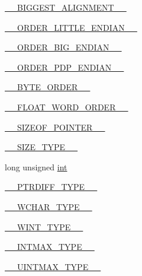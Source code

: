 \begin{DoxyCompactItemize}
\item 
\hyperlink{cmake-build-release_2CMakeCache_8txt_ade3bae6ac3c6cb0079bc5a1a61316c5a}{\+\_\+\+\_\+\+B\+I\+G\+G\+E\+S\+T\+\_\+\+A\+L\+I\+G\+N\+M\+E\+N\+T\+\_\+\+\_\+}
\item 
\hyperlink{cmake-build-release_2CMakeCache_8txt_a668b60d2f5086a7b075f8d739e3a02d5}{\+\_\+\+\_\+\+O\+R\+D\+E\+R\+\_\+\+L\+I\+T\+T\+L\+E\+\_\+\+E\+N\+D\+I\+A\+N\+\_\+\+\_\+}
\item 
\hyperlink{cmake-build-release_2CMakeCache_8txt_aadebb1c0721f9b0a30fe99e903ab7379}{\+\_\+\+\_\+\+O\+R\+D\+E\+R\+\_\+\+B\+I\+G\+\_\+\+E\+N\+D\+I\+A\+N\+\_\+\+\_\+}
\item 
\hyperlink{cmake-build-release_2CMakeCache_8txt_a1d768fc4923117ddc111812917d014f1}{\+\_\+\+\_\+\+O\+R\+D\+E\+R\+\_\+\+P\+D\+P\+\_\+\+E\+N\+D\+I\+A\+N\+\_\+\+\_\+}
\item 
\hyperlink{cmake-build-release_2CMakeCache_8txt_a06b21194cf5550fb37cc1282001bdc0e}{\+\_\+\+\_\+\+B\+Y\+T\+E\+\_\+\+O\+R\+D\+E\+R\+\_\+\+\_\+}
\item 
\hyperlink{cmake-build-release_2CMakeCache_8txt_af83df19811ef575ae2b34e8c904a0408}{\+\_\+\+\_\+\+F\+L\+O\+A\+T\+\_\+\+W\+O\+R\+D\+\_\+\+O\+R\+D\+E\+R\+\_\+\+\_\+}
\item 
\hyperlink{cmake-build-release_2CMakeCache_8txt_a1ee656ff8807634813d40465fb2bcdc1}{\+\_\+\+\_\+\+S\+I\+Z\+E\+O\+F\+\_\+\+P\+O\+I\+N\+T\+E\+R\+\_\+\+\_\+}
\item 
\hyperlink{cmake-build-release_2CMakeCache_8txt_afad16a5dece04ae3a5d68fc746889cdd}{\+\_\+\+\_\+\+S\+I\+Z\+E\+\_\+\+T\+Y\+P\+E\+\_\+\+\_\+}
\item 
long unsigned \hyperlink{cmake-build-release_2CMakeCache_8txt_a79a3d8790b2588b09777910863574e09}{int}
\item 
\hyperlink{cmake-build-release_2CMakeCache_8txt_a2e569667c74a773d6110a55fb19fe7d7}{\+\_\+\+\_\+\+P\+T\+R\+D\+I\+F\+F\+\_\+\+T\+Y\+P\+E\+\_\+\+\_\+}
\item 
\hyperlink{cmake-build-release_2CMakeCache_8txt_a20f76e5c58ddc0926b85e9093730c9ae}{\+\_\+\+\_\+\+W\+C\+H\+A\+R\+\_\+\+T\+Y\+P\+E\+\_\+\+\_\+}
\item 
\hyperlink{cmake-build-release_2CMakeCache_8txt_ab9eb6de4ef3e35d820fa14bf279673c6}{\+\_\+\+\_\+\+W\+I\+N\+T\+\_\+\+T\+Y\+P\+E\+\_\+\+\_\+}
\item 
\hyperlink{cmake-build-release_2CMakeCache_8txt_add72759aac6536e641bc2e8c12366d4b}{\+\_\+\+\_\+\+I\+N\+T\+M\+A\+X\+\_\+\+T\+Y\+P\+E\+\_\+\+\_\+}
\item 
\hyperlink{cmake-build-release_2CMakeCache_8txt_ae27a42a4b7ff92c051bf4badd2702611}{\+\_\+\+\_\+\+U\+I\+N\+T\+M\+A\+X\+\_\+\+T\+Y\+P\+E\+\_\+\+\_\+}

\end{DoxyCompactItemize}
